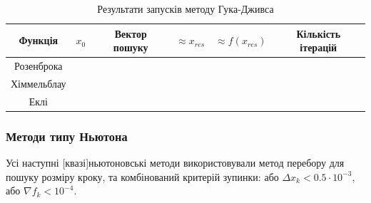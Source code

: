 \begin{table}[h!]
    \centering
    \begin{tabular}{|c|c|c|c|c|c|}
        \hline
        \textbf{Функція} & $x_0$ & \textbf{Вектор пошуку} & $\approx x_{res}$ & $\approx f(x_{res})$ & \textbf{Кількість ітерацій}  \\
        \hline
        \multirow{4}{*}{Розенброка} & & & & &  \\
        \cline{2-6}
        & & & & &
        \\ \cline{2-6}
        & & & & &
        \\ \cline{2-6}
        & & & & &
        \\ \hline
        \multirow{4}{*}{Хіммельблау} & & & & &  \\
        \cline{2-6}
        & & & & &
        \\ \cline{2-6}
        & & & & &
        \\ \cline{2-6}
        & & & & &
        \\ \hline
        \multirow{4}{*}{Еклі} & & & & &  \\
        \cline{2-6}
        & & & & &
        \\ \cline{2-6}
        & & & & &
        \\ \cline{2-6}
        & & & & &
        \\ \hline
    \end{tabular}
    \caption{Результати запусків методу Гука-Дживса}
\end{table}

\subsubsection*{Методи типу Ньютона}

Усі наступні [квазі]ньютоновські методи використовували
метод перебору для пошуку розміру кроку, та
комбінований критерій зупинки:
або $\Delta x_k < 0.5 \cdot 10^{-3}$,
або $\nabla f_k < 10^{-4}$.

